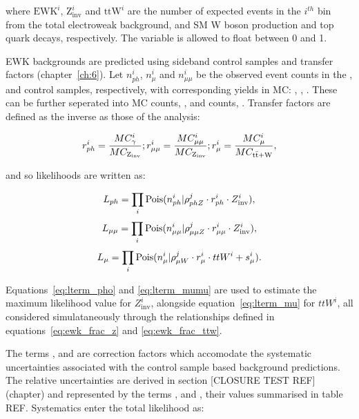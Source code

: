 where $\text{EWK}^i$, $\text{Z}_{\text{inv}}^i$ and $\text{ttW}^i$ are the number of 
expected events in the $i^{th}$ bin from the total electroweak background, \zinv
and SM W boson production and top quark decays, respectively. The variable 
\fzinv is allowed to float between 0 and 1.

EWK backgrounds are predicted using sideband control samples and transfer 
factors (chapter~\ref{ch:6}). Let $n_{ph}^i$, $n_{\mu}^i$ and $n_{\mu\mu}^i$ be 
the observed event counts in the \gj, \mj and \mmj control samples, 
respectively, with corresponding yields in MC: \mcp, \mcm, \mcmm. These can be
further seperated into \zinv MC counts,
\mczinv, and  counts, \mcttw. Transfer
factors are defined as the inverse as those of the analysis:

\begin{equation}
r_{ph}^i = \frac{MC_{\gamma}^i}{MC_{\text{Z}_{\text{inv}}}};
r_{\mu\mu}^i = \frac{MC_{\mu\mu}^i}{MC_{\text{Z}_{\text{inv}}}};
r_{\mu}^i = \frac{MC_{\mu}^i}{MC_{\rm{t}\bar{\rm{t}}+\text{W}}},
\end{equation}

and so likelihoods are written as:

\begin{equation}
L_{ph} = \prod_i \text{Pois}(n_{ph}^i | \rho^j_{phZ} \cdot r^i_{ph} \cdot Z^i_{\text{inv}}),
\label{eq:lterm_pho}
\end{equation}
\begin{equation}
L_{\mu\mu} = \prod_i \text{Pois}(n_{\mu\mu}^i | \rho^j_{\mu\mu Z} \cdot r^i_{\mu\mu} \cdot Z^i_{\text{inv}}),
\label{eq:lterm_mumu}
\end{equation}
\begin{equation}
L_{\mu} = \prod_i \text{Pois}(n_{\mu}^i | \rho^j_{\mu W} \cdot r^i_{\mu} \cdot ttW^i + s_{\mu}^i).
\label{eq:lterm_mu}
\end{equation}

Equations~\ref{eq:lterm_pho} and \ref{eq:lterm_mumu} are used to estimate the 
maximum likelihood value for $Z^i_{\text{inv}}$, alongside equation~\ref{eq:lterm_mu} 
for $ttW^i$, all considered simulataneously through the relationships defined in
equations~\ref{eq:ewk_frac_z} and \ref{eq:ewk_frac_ttw}.

The terms \rhopz, \rhommz and \rhomw are correction factors which accomodate the
systematic uncertainties associated with the control sample based background 
predictions. The relative uncertainties are derived in section [CLOSURE TEST REF]
(chapter) and represented by the terms \sigmapz, \sigmammz and \sigmamw, their 
values summarised in table REF. Systematics enter the total likelihood as:

